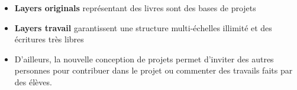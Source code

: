 \begin{itemize}
    \item \textbf{Layers originals} représentant des livres sont des bases de projets
    \item \textbf{Layers travail} garantissent une structure multi-échelles illimité et des écritures très libres
    \item D'ailleurs, la nouvelle conception de projets permet d'inviter des autres personnes pour contribuer dans le projet ou commenter des travails faits par des élèves. 
\end{itemize}
